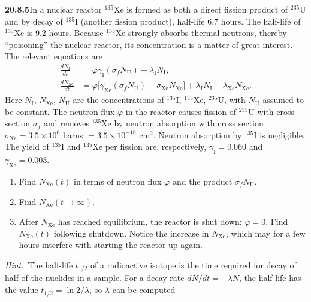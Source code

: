 \par\bigskip
\noindent\textbf{20.8.5}\quad In a nuclear reactor $^{135}$Xe is
formed as both a direct fission product of $^{235}$U and by decay
of $^{135}$I (another fission product), half-life 6.7 hours. The
half-life of $^{135}$Xe is 9.2 hours. Because $^{135}$Xe strongly
absorbs thermal neutrons, thereby ``poisoning'' the nuclear
reactor, its concentration is a matter of great interest. The
relevant equations are
\begin{align*}
\frac{dN_{\mathrm{I}}}{dt}
&=\varphi\gamma_{\mathrm{I}}(\sigma_{f}N_{\mathrm{U}})
-\lambda_{\mathrm{I}}N_{\mathrm{I}},\\
\frac{dN_{\mathrm{Xe}}}{dt}
&=\varphi\big[\gamma_{\mathrm{Xe}}(\sigma_{f}N_{\mathrm{U}})
-\sigma_{\mathrm{Xe}}N_{\mathrm{Xe}}\big]
+\lambda_{\mathrm{I}}N_{\mathrm{I}}
-\lambda_{\mathrm{Xe}}N_{\mathrm{Xe}}.
\end{align*}
Here $N_{\mathrm{I}}$, $N_{\mathrm{Xe}}$, $N_{\mathrm{U}}$ are the
concentrations of $^{135}$I, $^{135}$Xe, $^{235}$U, with
$N_{\mathrm{U}}$ assumed to be constant. The neutron flux
$\varphi$ in the reactor causes fission of $^{235}$U with cross
section $\sigma_{f}$ and removes $^{135}$Xe by neutron absorption
with cross section $\sigma_{\mathrm{Xe}}=3.5\times10^{6}$ barns
$=3.5\times10^{-18}$ cm$^{2}$. Neutron absorption by $^{135}$I is
negligible. The yield of $^{135}$I and $^{135}$Xe per fission
are, respectively, $\gamma_{\mathrm{I}}=0.060$ and
$\gamma_{\mathrm{Xe}}=0.003$.
\begin{enumerate}
\item[(a)] Find $N_{\mathrm{Xe}}(t)$ in terms of neutron flux
$\varphi$ and the product $\sigma_{f}N_{\mathrm{U}}$.
\item[(b)] Find $N_{\mathrm{Xe}}(t\to\infty)$.
\item[(c)] After $N_{\mathrm{Xe}}$ has reached equilibrium, the
reactor is shut down: $\varphi=0$. Find $N_{\mathrm{Xe}}(t)$
following shutdown. Notice the increase in $N_{\mathrm{Xe}}$,
which may for a few hours interfere with starting the reactor
up again. 
\end{enumerate}
\par\emph{Hint.}~The half-life $t_{1/2}$ of a radioactive
isotope is the time required for decay of half of the nuclides in
a sample. For a decay rate $dN/dt=-\lambda N$, the half-life has
the value $t_{1/2}=\ln 2/\lambda$, so $\lambda$ can be computed
